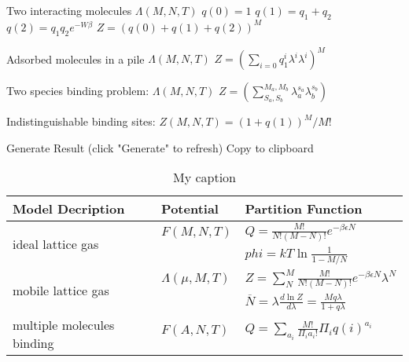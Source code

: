 \documentclass[12pt, oneside]{article}   	%
\begin{document}
Two interacting molecules 
$\Lambda(M, N,T)$ 
$q(0) = 1 $
$q(1) = q_1 + q_2$
$q(2) = q_1 q_2 e^{- W \beta}$
$Z = (q(0) + q(1) + q(2))^M$

Adsorbed molecules in a pile 
$\Lambda(M, N,T)$  
$Z = ( \sum_{i =0 } q_1^i \lambda^i \lambda^i)^M $

Two species binding problem: 
$\Lambda(M, N,T)$ 
$Z = (\sum_{S_a,S_b} ^{M_a, M_b} \lambda_a^{s_a} \lambda_b^{s_b})$

Indistinguishable binding sites: 
$Z(M , N, T) = (1 + q(1))^M / M!$



 Generate
Result (click "Generate" to refresh) Copy to clipboard
\begin{table}[]
\centering
\caption{My caption}
\label{my-label}
\begin{tabular}{lll}
\hline
\multicolumn{1}{|l|}{Model Decription}                                        & \multicolumn{1}{l|}{Potential}            & \multicolumn{1}{l|}{Partition Function}                                                                      \\ \hline
\multicolumn{1}{|l|}{\multirow{2}{*}{ideal lattice gas}}                      & \multicolumn{1}{l|}{$F(M,N,T)$}           & \multicolumn{1}{l|}{$Q = \frac{M!}{N! (M-N)!} e^{-\beta \epsilon N}$}                                        \\ \cline{2-3} 
\multicolumn{1}{|l|}{}                                                        & \multicolumn{1}{l|}{}                     & \multicolumn{1}{l|}{$phi = kT \ln \frac{1}{1- M/N}$}                                                         \\ \hline
\multicolumn{1}{|l|}{\multirow{2}{*}{mobile lattice gas}}                     & \multicolumn{1}{l|}{$\Lambda(\mu, M, T)$} & \multicolumn{1}{l|}{$Z = \sum_N^{M} \frac{M!}{N!(M-N)!} e^{-\beta \epsilon N} \lambda^N$}                    \\ \cline{2-3} 
\multicolumn{1}{|l|}{}                                                        & \multicolumn{1}{l|}{}                     & \multicolumn{1}{l|}{$\overline{N} = \lambda \frac{d \ln Z }{d \lambda} = \frac{M q \lambda}{1 + q \lambda}$} \\ \hline
\multicolumn{1}{|l|}{\multirow{2}{*}{multiple molecules binding}}             & \multicolumn{1}{l|}{$F(A,N,T)$}           & \multicolumn{1}{l|}{$Q = \sum_{a_i} \frac{M!}{\Pi_i a_i! } \Pi_i q(i)^{a_i}$}                                \\ \cline{2-3} 

\end{tabular}
\end{table}
\end{document}
